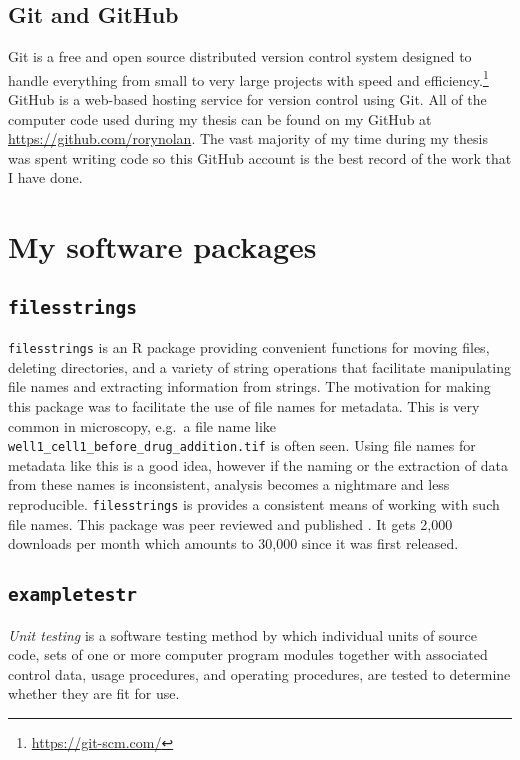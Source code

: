 \documentclass[12pt,]{book}
\let\rmarkdownfootnote\footnote%
\def\footnote{\protect\rmarkdownfootnote}
\theoremstyle{definition}
\theoremstyle{definition}
\theoremstyle{definition}
\theoremstyle{remark}
\let\BeginKnitrBlock\begin \let\EndKnitrBlock\end
\begin{document}
\subsection{Git and GitHub}\label{git-and-github}

Git is a free and open source distributed version control system
designed to handle everything from small to very large projects with
speed and efficiency.\footnote{\url{https://git-scm.com/}} GitHub is a
web-based hosting service for version control using Git. All of the
computer code used during my thesis can be found on my GitHub at
\url{https://github.com/rorynolan}. The vast majority of my time during
my thesis was spent writing code so this GitHub account is the best
record of the work that I have done.

\section{My software packages}\label{my-software-packages}

\subsection{\texorpdfstring{\texttt{filesstrings}}{filesstrings}}\label{filesstrings}

\texttt{filesstrings} is an R package providing convenient functions for
moving files, deleting directories, and a variety of string operations
that facilitate manipulating file names and extracting information from
strings. The motivation for making this package was to facilitate the
use of file names for metadata. This is very common in microscopy,
e.g.~a file name like \texttt{well1\_cell1\_before\_drug\_addition.tif}
is often seen. Using file names for metadata like this is a good idea,
however if the naming or the extraction of data from these names is
inconsistent, analysis becomes a nightmare and less reproducible.
\texttt{filesstrings} is provides a consistent means of working with
such file names. This package was peer reviewed and published
\citep{filesstrings}. It gets 2,000 downloads per month which amounts to
30,000 since it was first released.

\subsection{\texorpdfstring{\texttt{exampletestr}}{exampletestr}}\label{exampletestr}

\BeginKnitrBlock{definition}
\protect\hypertarget{def:unnamed-chunk-28}{}{\label{def:unnamed-chunk-28}
}\emph{Unit testing} is a software testing method by which individual
units of source code, sets of one or more computer program modules
together with associated control data, usage procedures, and operating
procedures, are tested to determine whether they are fit for use.
\EndKnitrBlock{definition}
\end{document}
